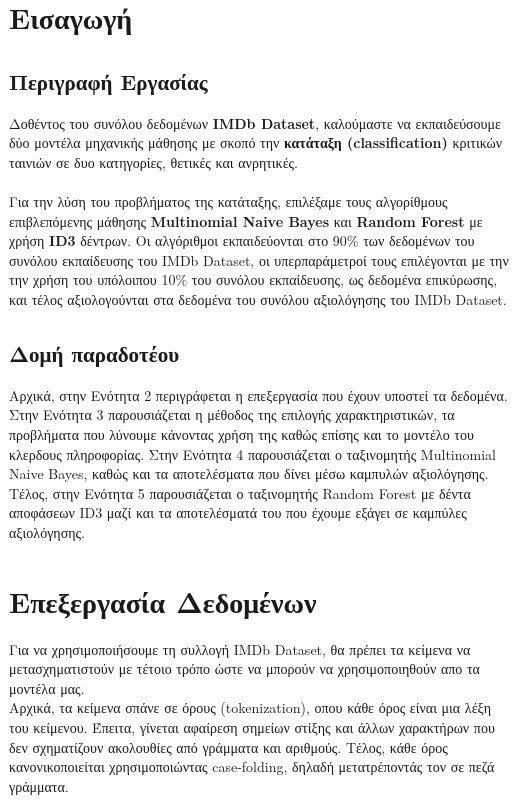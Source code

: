\documentclass[12pt]{article}
\begin{document}
    
    
\section{Εισαγωγή}
\subsection{Περιγραφή Εργασίας}
Δοθέντος του συνόλου δεδομένων \textbf{IMDb Dataset}, καλούμαστε να εκπαιδεύσουμε δύο μοντέλα μηχανικής μάθησης με σκοπό την \textbf{κατάταξη (classification)} κριτικών ταινιών σε δυο κατηγορίες, θετικές και ανρητικές.\\\\
Για την λύση του προβλήματος της κατάταξης, επιλέξαμε τους αλγορίθμους επιβλεπόμενης μάθησης \textbf{Multinomial Naive Bayes} και \textbf{Random Forest} με χρήση \textbf{ID3} δέντρων. Οι αλγόριθμοι εκπαιδεύονται στο 90\% των δεδομένων του συνόλου εκπαίδευσης του IMDb Dataset, οι υπερπαράμετροί τους επιλέγονται με την την χρήση του υπόλοιπου 10\% του συνόλου εκπαίδευσης, ως δεδομένα επικύρωσης, και τέλος αξιολογούνται στα δεδομένα του συνόλου αξιολόγησης του IMDb Dataset.

\subsection{Δομή παραδοτέου}
Αρχικά, στην Ενότητα 2 περιγράφεται η επεξεργασία που έχουν υποστεί τα δεδομένα. Στην Ενότητα 3 παρουσιάζεται η μέθοδος της επιλογής χαρακτηριστικών, τα προβλήματα που λύνουμε κάνοντας χρήση της καθώς επίσης και το μοντέλο του κλερδους πληροφορίας. Στην Ενότητα 4 παρουσιάζεται ο ταξινομητής Multinomial Naive Bayes, καθώς και τα αποτελέσματα που δίνει μέσω καμπυλών αξιολόγησης. Τέλος, στην Ενότητα 5 παρουσιάζεται ο ταξινομητής Random Forest με δέντα αποφάσεων ID3 μαζί και τα αποτελέσματά του που έχουμε εξάγει σε καμπύλες αξιολόγησης.

\section{Επεξεργασία Δεδομένων}
Για να χρησιμοποιήσουμε τη συλλογή IMDb Dataset, θα πρέπει τα κείμενα να μετασχηματιστούν με τέτοιο τρόπο ώστε να μπορούν να χρησιμοποιηθούν απο τα μοντέλα μας.\\
Αρχικά, τα κείμενα σπάνε σε όρους (tokenization), οπου κάθε όρος είναι μια λέξη του κείμενου. Έπειτα, γίνεται αφαίρεση σημείων στίξης και άλλων χαρακτήρων που δεν σχηματίζουν ακολουθίες από γράμματα και αριθμούς. Τέλος, κάθε όρος κανονικοποιείται χρησιμοποιώντας case-folding, δηλαδή μετατρέποντάς τον σε πεζά γράμματα.
\end{document}
